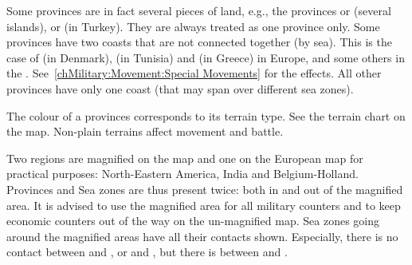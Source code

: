 \label{chBasics:Disconnected Provinces} Some
provinces are in fact several pieces of land, e.g., the provinces
\provinceCyclades or \provinceBaleares (several islands), or
\provinceCanakkale (in Turkey). They are always treated as one province only.
\label{chBasics:Multiple Coasts} Some provinces
have two coasts that are not connected together (by sea). This is the case of
\provinceSlesvig (in Denmark), \provinceIfriqiya (in Tunisia) and
\provinceHellas (in Greece) in Europe, and some others in the
\ROTW. See~\ref{chMilitary:Movement:Special Movements} for the effects.
\bparag All other provinces have only one coast (that may span over different
sea zones).

\aparag[Terrain] The colour of a provinces corresponds to its terrain
type. See the terrain chart on the map. Non-plain terrains affect movement and
battle.

\aparag Two regions are magnified on the \ROTW map and one on the European map
for practical purposes: North-Eastern America, India and Belgium-Holland.
\bparag Provinces and Sea zones are thus present twice: both in and out of the
magnified area. It is advised to use the magnified area for all military
counters and to keep economic counters out of the way on the un-magnified map.
\bparag Sea zones going around the magnified areas have all their contacts
shown. Especially, there is no contact between \seazoneMaldives and
, or \seazoneQuarantiemes and \seazoneIndien, but there is
between \seazoneQuarantiemes and .

